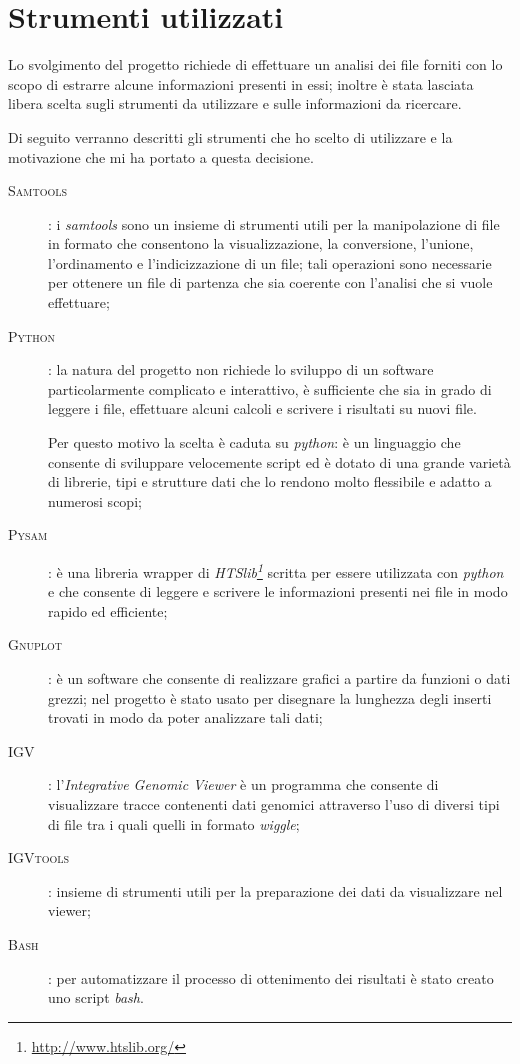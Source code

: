 \section{Strumenti utilizzati}
Lo svolgimento del progetto richiede di effettuare un analisi dei file  forniti con lo scopo di estrarre alcune informazioni presenti in essi; inoltre è stata lasciata libera scelta sugli strumenti da utilizzare e sulle informazioni da ricercare.

Di seguito verranno descritti gli strumenti che ho scelto di utilizzare e la motivazione che mi ha portato a questa decisione.

\begin{description}
	\item[\textsc{Samtools}]: i \emph{samtools} sono un insieme di strumenti utili per la manipolazione di file in formato  che consentono la visualizzazione, la conversione, l'unione, l'ordinamento e l'indicizzazione di un file; tali operazioni sono necessarie per ottenere un file di partenza che sia coerente con l'analisi che si vuole effettuare;
	\item[\textsc{Python}]: la natura del progetto non richiede lo sviluppo di un software particolarmente complicato e interattivo, è sufficiente che sia in grado di leggere i file, effettuare alcuni calcoli e scrivere i risultati su nuovi file.

	Per questo motivo la scelta è caduta su \emph{python}: è un linguaggio che consente di sviluppare velocemente script ed è dotato di una grande varietà di librerie, tipi e strutture dati che lo rendono molto flessibile e adatto a numerosi scopi;
	\item[\textsc{Pysam}]: è una libreria wrapper di \emph{HTSlib\footnote{\url{http://www.htslib.org/}}} scritta per essere utilizzata con \emph{python} e che consente di leggere e scrivere le informazioni presenti nei  file in modo rapido ed efficiente;
	\item[\textsc{Gnuplot}]: è un software che consente di realizzare grafici a partire da funzioni o dati grezzi; nel progetto è stato usato per disegnare la lunghezza degli inserti trovati in modo da poter analizzare tali dati;
	\item[\textsc{IGV}]: l'\emph{Integrative Genomic Viewer} è un programma che consente di visualizzare tracce contenenti dati genomici attraverso l'uso di diversi tipi di file tra i quali quelli in formato \emph{wiggle};
	\item[\textsc{IGVtools}]: insieme di strumenti utili per la preparazione dei dati da visualizzare nel viewer;
	\item[\textsc{Bash}]: per automatizzare il processo di ottenimento dei risultati è stato creato uno script \emph{bash}.
\end{description}